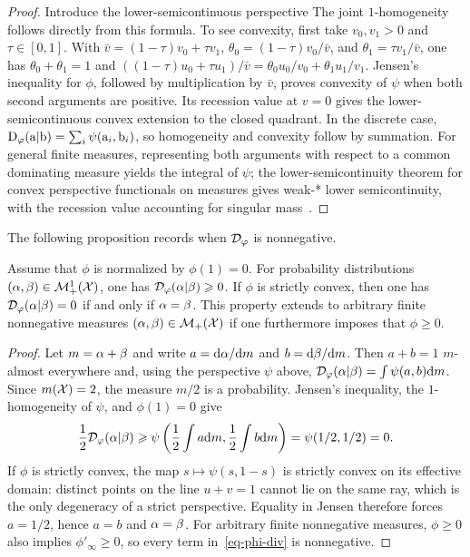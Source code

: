 \begin{proof}
	Introduce the lower-semicontinuous perspective
	The joint $1$-homogeneity follows directly from this formula. To see convexity, first take $v_0,v_1>0$ and $\tau\in[0,1]$. With $\bar v=(1-\tau)v_0+\tau v_1$,
	$\theta_0=(1-\tau)v_0/\bar v$, and $\theta_1=\tau v_1/\bar v$, one has
	$\theta_0+\theta_1=1$ and
	$((1-\tau)u_0+\tau u_1)/\bar v
	=\theta_0u_0/v_0+\theta_1u_1/v_1$.
	Jensen's inequality for $\phi$, followed by multiplication by $\bar v$, proves convexity of $\psi$ when both second arguments are positive. Its recession value at $v=0$ gives the lower-semicontinuous convex extension to the closed quadrant. In the discrete case,
	\(\mathrm{D}_\varphi(\mathrm{a}|\mathrm{b}) = \sum_i \psi(\mathrm{a}_i,\mathrm{b}_i)\),
	so homogeneity and convexity follow by summation. For general finite measures, representing both arguments with respect to a common dominating measure yields the integral of $\psi$; the lower-semicontinuity theorem for convex perspective functionals on measures gives weak-* lower semicontinuity, with the recession value accounting for singular mass~\cite{LieroMielkeSavareLong}.
\end{proof}

The following proposition records when $\mathcal{D}_\varphi$ is nonnegative.

\begin{proposition}\label{phi-div-positive}
Assume that $\phi$ is normalized by $\phi(1)=0$. For probability distributions $(\alpha,\beta) \in \mathcal{M}_+^1(\mathcal{X})$, one has $\mathcal{D}_\varphi(\alpha|\beta) \geqslant 0$. If $\phi$ is strictly convex, then one has $\mathcal{D}_\varphi(\alpha|\beta)=0$ if and only if $\alpha=\beta$.
%
This property extends to arbitrary finite nonnegative measures $(\alpha,\beta) \in \mathcal{M}_+(\mathcal{X})$ if one furthermore imposes that $\phi \geq 0$.
\end{proposition}

\begin{proof}
	Let $m=\alpha+\beta$ and write $a=\mathrm{d}\alpha/\mathrm{d} m$ and $b=\mathrm{d}\beta/\mathrm{d} m$. Then $a+b=1$ $m$-almost everywhere and, using the perspective $\psi$ above,
		\(\mathcal{D}_\varphi(\alpha|\beta)=\int \psi(a,b)\mathrm{d} m\).
	Since $m(\mathcal{X})=2$, the measure $m/2$ is a probability. Jensen's inequality, the $1$-homogeneity of $\psi$, and $\phi(1)=0$ give
		\[
			\frac12\mathcal{D}_\varphi(\alpha|\beta)
			\geqslant
			\psi\left( \frac12\int a\mathrm{d} m,\frac12\int b\mathrm{d} m \right)
			=\psi(1/2,1/2)=0.
		\]
	If $\phi$ is strictly convex, the map $s\mapsto\psi(s,1-s)$ is strictly convex on its effective domain: distinct points on the line $u+v=1$ cannot lie on the same ray, which is the only degeneracy of a strict perspective. Equality in Jensen therefore forces $a=1/2$, hence $a=b$ and $\alpha=\beta$. For arbitrary finite nonnegative measures, $\phi\geq0$ also implies $\phi'_\infty\geq0$, so every term in~\eqref{eq-phi-div} is nonnegative.
\end{proof}

